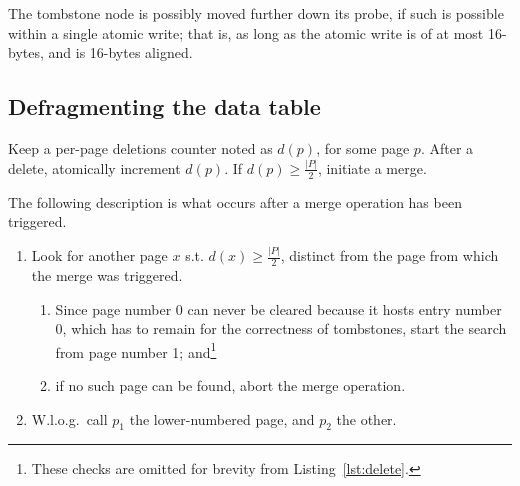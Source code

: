 The tombstone node is possibly moved further down its probe, if such is possible within a single atomic write; that is, as long as the atomic write is of at most 16-bytes, and is 16-bytes aligned.


\subsection{Defragmenting the data table}\label{subsec:defragmenting}

Keep a per-page deletions counter noted as $d(p)$, for some page $p$.
After a delete, atomically increment $d(p)$.
If $d(p) \geq \frac{|P|}{2}$, initiate a merge.

The following description is what occurs after a merge operation has been triggered.
\begin{enumerate}
	\item Look for another page $x$ s.t. $d(x) \geq \frac{|P|}{2}$, distinct from the page from which the merge was triggered.
	\begin{enumerate}
		\item Since page number 0 can never be cleared because it hosts entry number 0, which has to remain for the correctness of tombstones, start the search from page number 1; and\footnote{%
			These checks are omitted for brevity from Listing~\ref{lst:delete}.
		}
		\item if no such page can be found, abort the merge operation.
	\end{enumerate}
	\item W.l.o.g.\ call $p_1$ the lower-numbered page, and $p_2$ the other.

\end{enumerate}
